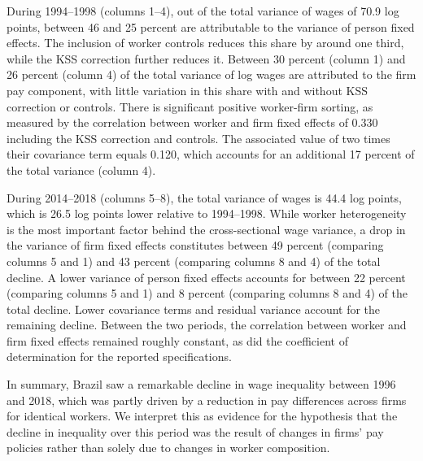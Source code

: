 During 1994--1998 (columns 1--4), out of the total variance of wages of 70.9 log points, between 46 and 25 percent are attributable to the variance of person fixed effects. The inclusion of worker controls reduces this share by around one third, while the KSS correction further reduces it. Between 30 percent (column 1) and 26 percent (column 4) of the total variance of log wages are attributed to the firm pay component, with little variation in this share with and without KSS correction or controls. There is significant positive worker-firm sorting, as measured by the correlation between worker and firm fixed effects of 0.330 including the KSS correction and controls. The associated value of two times their covariance term equals 0.120, which accounts for an additional 17 percent of the total variance (column 4).

During 2014--2018 (columns 5--8), the total variance of wages is 44.4 log points, which is 26.5 log points lower relative to 1994--1998. While worker heterogeneity is the most important factor behind the cross-sectional wage variance, a drop in the variance of firm fixed effects constitutes between 49 percent (comparing columns 5 and 1) and 43 percent (comparing columns 8 and 4) of the total decline. A lower variance of person fixed effects accounts for between 22 percent (comparing columns 5 and 1) and 8 percent (comparing columns 8 and 4) of the total decline. Lower covariance terms and residual variance account for the remaining decline. Between the two periods, the correlation between worker and firm fixed effects remained roughly constant, as did the coefficient of determination for the reported specifications.

In summary, Brazil saw a remarkable decline in wage inequality between 1996 and 2018, which was partly driven by a reduction in pay differences across firms for identical workers. We interpret this as evidence for the hypothesis that the decline in inequality over this period was the result of changes in firms' pay policies rather than solely due to changes in worker composition.
